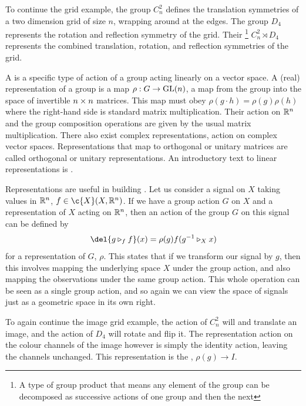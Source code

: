 To continue the grid example, the group \(C_n^2\) defines the translation symmetries of a two dimension grid of size \(n\), wrapping around at the edges.
The group \(D_4\) represents the rotation and reflection symmetry of the grid.
Their \footnote{A type of group product that means any element of the group can be decomposed as successive actions of one group and then the next} \(C_n^2 \rtimes D_4\) represents the combined translation, rotation, and reflection symmetries of the grid.

A  is a specific type of action of a group acting linearly on a vector space.
A (real) representation of a group is a map \(\rho: G \to \mathrm{GL}(n)\), a map from the group into the space of invertible \(n\times n\) matrices.
This map must obey \(\rho(g\cdot h) = \rho(g) \rho(h)\) where the right-hand side is standard matrix multiplication.
Their action on \(\mathbb{R}^n\) and the group composition operations are given by the usual matrix multiplication.
There also exist complex representations, action on complex vector spaces.
Representations that map to orthogonal or unitary matrices are called orthogonal or unitary representations.
An introductory text to linear representations is \textcite{serreFiniteGroups}.

Representations are useful in building .
Let us consider a signal on \(X\) taking values in \(\mathbb{R}^n\), \(f \in \c{X}(X, \R^n)\).
If we have a group action \(G\) on \(X\) and a representation of \(X\) acting on \(\mathbb{R}^n\), then an action of the group \(G\) on this signal can be defined by 
\[\del{g\triangleright_f f}(x) = \rho(g) f(g^{-1} \triangleright_X x)\]
for a representation of \(G\), \(\rho\).
This states that if we transform our signal by \(g\), then this involves mapping the underlying space \(X\) under the group action, and also mapping the observations under the same group action.
This whole operation can be seen as a single group action, and so again we can view the space of signals just as a geometric space in its own right.

To again continue the image grid example, the action of \(C_n^2\) will and translate an image, and the action of \(D_4\) will rotate and flip it.
The representation action on the colour channels of the image however is simply the identity action, leaving the channels unchanged.
This representation is the , \(\rho(g) \to I\).

